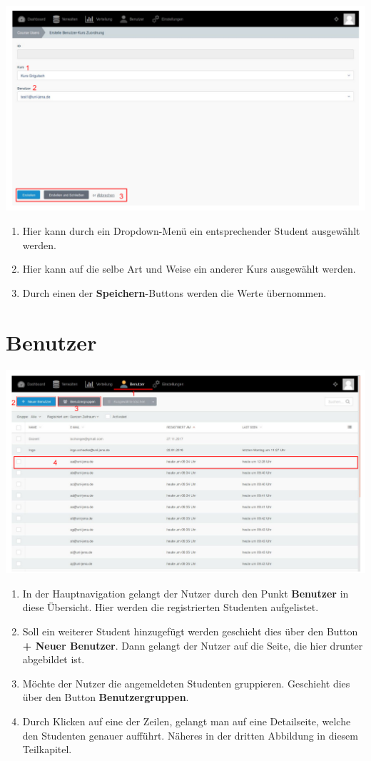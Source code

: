   
  \includegraphics[scale=0.3]{backend/img/distribution_5.pdf}
  \begin{enumerate}
   \item Hier kann durch ein Dropdown-Menü ein entsprechender Student ausgewählt werden.
   \item Hier kann auf die selbe Art und Weise ein anderer Kurs ausgewählt werden.
   \item Durch einen der \textbf{Speichern}-Buttons werden die Werte übernommen.
  \end{enumerate}

  \section{Benutzer}
  \label{section:users}
  
  \includegraphics[scale=0.3]{backend/img/users_1.pdf}
  \begin{enumerate}
   \item In der Hauptnavigation gelangt der Nutzer durch den Punkt \textbf{Benutzer} in diese Übersicht.
	 Hier werden die registrierten Studenten aufgelistet.
   \item Soll ein weiterer Student hinzugefügt werden geschieht dies über den Button \textbf{+ Neuer Benutzer}.
	 Dann gelangt der Nutzer auf die Seite, die hier drunter abgebildet ist.
   \item Möchte der Nutzer die angemeldeten Studenten gruppieren. Geschieht dies über den Button \textbf{Benutzergruppen}.
   \item Durch Klicken auf eine der Zeilen, gelangt man auf eine Detailseite, welche den Studenten genauer aufführt.
	 Näheres in der dritten Abbildung in diesem Teilkapitel.
  \end{enumerate}

